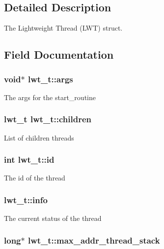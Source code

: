 \subsection{Detailed Description}
The Lightweight Thread (L\+W\+T) struct. 

\subsection{Field Documentation}
\hypertarget{structlwt_a6e870b21b996bc5c62b6cbd04328e784}{
\subsubsection[{args}]{\setlength{\rightskip}{0pt plus 5cm}void$\ast$ lwt\+\_\+t\+::args}}\label{structlwt_a6e870b21b996bc5c62b6cbd04328e784}
The args for the start\+\_\+routine \hypertarget{structlwt_a33d2fa8a95fe7c0deb7c7723bd4af344}{
\subsubsection[{children}]{\setlength{\rightskip}{0pt plus 5cm}lwt\+\_\+t lwt\+\_\+t\+::children}}\label{structlwt_a33d2fa8a95fe7c0deb7c7723bd4af344}
List of children threads \hypertarget{structlwt_aa3df3d76d606756e38bb9bd3d2c2d241}{
\subsubsection[{id}]{\setlength{\rightskip}{0pt plus 5cm}int lwt\+\_\+t\+::id}}\label{structlwt_aa3df3d76d606756e38bb9bd3d2c2d241}
The id of the thread \hypertarget{structlwt_a40641e751624b983f5e1ae5302210e5d}{
\subsubsection[{info}]{ lwt\+\_\+t\+::info}}\label{structlwt_a40641e751624b983f5e1ae5302210e5d}
The current status of the thread \hypertarget{structlwt_ae97cdce617ee026378588f57a999f972}{
\subsubsection[{max\+\_\+addr\+\_\+thread\+\_\+stack}]{\setlength{\rightskip}{0pt plus 5cm}long$\ast$ lwt\+\_\+t\+::max\+\_\+addr\+\_\+thread\+\_\+stack}}\label{structlwt_ae97cdce617ee026378588f57a999f972}
